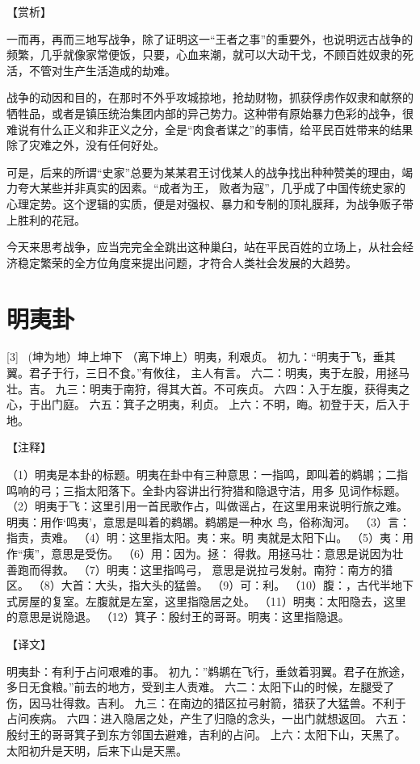 \documentclass[12pt,UTF8]{ctexbook}
\begin{document}
【赏析】

一而再，再而三地写战争，除了证明这一“王者之事”的重要外，也说明远古战争的频繁，几乎就像家常便饭，只要，心血来潮，就可以大动干戈，不顾百姓奴隶的死活，不管对生产生活造成的劫难。

战争的动因和目的，在那时不外乎攻城掠地，抢劫财物，抓获俘虏作奴隶和献祭的牺牲品，或者是镇压统治集团内部的异己势力。这种带有原始暴力色彩的战争，很难说有什么正义和非正义之分，全是“肉食者谋之”的事情，给平民百姓带来的结果除了灾难之外，没有任何好处。

可是，后来的所谓“史家”总要为某某君王讨伐某人的战争找出种种赞美的理由，竭力夸大某些并非真实的因素。“成者为王， 败者为寇”，几乎成了中国传统史家的心理定势。这个逻辑的实质，便是对强权、暴力和专制的顶礼膜拜，为战争贩子带上胜利的花冠。

今天来思考战争，应当完完全全跳出这种巢臼，站在平民百姓的立场上，从社会经济稳定繁荣的全方位角度来提出问题，才符合人类社会发展的大趋势。

\chapter{明夷卦}
[3] \ (坤为地）坤上坤下
（离下坤上）明夷，利艰贞。
初九：“明夷于飞，垂其翼。君子于行，三日不食。”有攸往， 主人有言。
六二：明夷，夷于左股，用拯马壮。吉。
九三：明夷于南狩，得其大首。不可疾贞。
六四：入于左腹，获得夷之心，于出门庭。
六五：箕子之明夷，利贞。
上六：不明，晦。初登于天，后入于地。

【注释】

（1）明夷是本卦的标题。明夷在卦中有三种意思：一指鸣，即叫着的鹈鹕；二指鸣响的弓；三指太阳落下。全卦内容讲出行狩猎和隐退守洁，用多 见词作标题。
（2）明夷于飞：这里引用一首民歌作占，叫做谣占，在这里用来说明行旅之难。明夷：用作‘鸣夷’，意思是叫着的鹈鹕。鹈鹕是一种水 鸟，俗称淘河。
（3）言：指责，责难。
（4）明：这里指太阳。夷：来。明 夷就是太阳下山。
（5）夷：用作“痍”，意思是受伤。
（6）用：因为。拯： 得救。用拯马壮：意思是说因为壮善跑而得救。
（7）明夷：这里指鸣弓， 意思是说拉弓发射。南狩：南方的猎区。
（8）大首：大头，指大头的猛兽。
（9）可：利。
（10）腹：，古代半地下式房屋的复室。左腹就是左室，这里指隐居之处。
（11）明夷：太阳隐去，这里的意思是说隐退。
（12）箕子：殷纣王的哥哥。明夷：这里指隐退。

【译文】

明夷卦：有利于占问艰难的事。
初九：”鹈鹕在飞行，垂敛着羽翼。君子在旅途，多日无食粮。”前去的地方，受到主人责难。
六二：太阳下山的时候，左腿受了伤，因马壮得救。吉利。
九三：在南边的猎区拉弓射箭，猎获了大猛兽。不利于占问疾病。
六四：进入隐居之处，产生了归隐的念头，一出门就想返回。
六五：殷纣王的哥哥箕子到东方邻国去避难，吉利的占问。
上六：太阳下山，天黑了。太阳初升是天明，后来下山是天黑。
\end{document}
